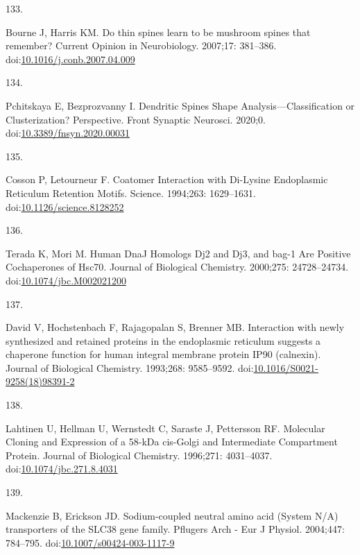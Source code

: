 \documentclass[
  12pt,
  a4paper,
]{book}
\newlength{\cslhangindent}
\newlength{\csllabelwidth}
\newenvironment{CSLReferences}[2] %
 {\begin{list}{}{%
  \setlength{\itemindent}{0pt}
  \setlength{\leftmargin}{0pt}
  \setlength{\parsep}{0pt}
  \ifodd #1
   \setlength{\leftmargin}{\cslhangindent}
   \setlength{\itemindent}{-1\cslhangindent}
  \fi
  \setlength{\itemsep}{#2\baselineskip}}}
 {\end{list}}
\newcommand{\CSLLeftMargin}[1]{\parbox[t]{\csllabelwidth}{\strut#1\strut}}
\newcommand{\CSLRightInline}[1]{\parbox[t]{\linewidth - \csllabelwidth}{\strut#1\strut}}
\begin{document}
\begin{CSLReferences}{0}{1}
\CSLLeftMargin{133. }%
\CSLRightInline{Bourne J, Harris KM. Do thin spines learn to be mushroom spines that remember? Current Opinion in Neurobiology. 2007;17: 381--386. doi:\href{https://doi.org/10.1016/j.conb.2007.04.009}{10.1016/j.conb.2007.04.009}}

\CSLLeftMargin{134. }%
\CSLRightInline{Pchitskaya E, Bezprozvanny I. Dendritic {Spines Shape Analysis}---{Classification} or {Clusterization}? {Perspective}. Front Synaptic Neurosci. 2020;0. doi:\href{https://doi.org/10.3389/fnsyn.2020.00031}{10.3389/fnsyn.2020.00031}}

\CSLLeftMargin{135. }%
\CSLRightInline{Cosson P, Letourneur F. Coatomer {Interaction} with {Di-Lysine Endoplasmic Reticulum Retention Motifs}. Science. 1994;263: 1629--1631. doi:\href{https://doi.org/10.1126/science.8128252}{10.1126/science.8128252}}

\CSLLeftMargin{136. }%
\CSLRightInline{Terada K, Mori M. Human {DnaJ Homologs} Dj2 and Dj3, and bag-1 {Are Positive Cochaperones} of Hsc70. Journal of Biological Chemistry. 2000;275: 24728--24734. doi:\href{https://doi.org/10.1074/jbc.M002021200}{10.1074/jbc.M002021200}}

\CSLLeftMargin{137. }%
\CSLRightInline{David V, Hochstenbach F, Rajagopalan S, Brenner MB. Interaction with newly synthesized and retained proteins in the endoplasmic reticulum suggests a chaperone function for human integral membrane protein {IP90} (calnexin). Journal of Biological Chemistry. 1993;268: 9585--9592. doi:\href{https://doi.org/10.1016/S0021-9258(18)98391-2}{10.1016/S0021-9258(18)98391-2}}

\CSLLeftMargin{138. }%
\CSLRightInline{Lahtinen U, Hellman U, Wernstedt C, Saraste J, Pettersson RF. Molecular {Cloning} and {Expression} of a 58-{kDa} cis-{Golgi} and {Intermediate Compartment Protein}. Journal of Biological Chemistry. 1996;271: 4031--4037. doi:\href{https://doi.org/10.1074/jbc.271.8.4031}{10.1074/jbc.271.8.4031}}

\CSLLeftMargin{139. }%
\CSLRightInline{Mackenzie B, Erickson JD. Sodium-coupled neutral amino acid ({System N}/{A}) transporters of the {SLC38} gene family. Pflugers Arch - Eur J Physiol. 2004;447: 784--795. doi:\href{https://doi.org/10.1007/s00424-003-1117-9}{10.1007/s00424-003-1117-9}}


\end{CSLReferences}
\end{document}
